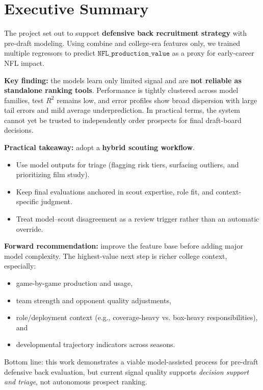\section{Executive Summary}

The project set out to support \textbf{defensive back recruitment strategy} with pre-draft modeling. Using combine and college-era features only, we trained multiple regressors to predict $\texttt{NFL\_production\_value}$ as a proxy for early-career NFL impact.

\textbf{Key finding:} the models learn only limited signal and are \textbf{not reliable as standalone ranking tools}. Performance is tightly clustered across model families, test $R^2$ remains low, and error profiles show broad dispersion with large tail errors and mild average underprediction. In practical terms, the system cannot yet be trusted to independently order prospects for final draft-board decisions.

\textbf{Practical takeaway:} adopt a \textbf{hybrid scouting workflow}.
\begin{itemize}
    \item Use model outputs for triage (flagging risk tiers, surfacing outliers, and prioritizing film study).
    \item Keep final evaluations anchored in scout expertise, role fit, and context-specific judgment.
    \item Treat model--scout disagreement as a review trigger rather than an automatic override.
\end{itemize}

\textbf{Forward recommendation:} improve the feature base before adding major model complexity. The highest-value next step is richer college context, especially:
\begin{itemize}
    \item game-by-game production and usage,
    \item team strength and opponent quality adjustments,
    \item role/deployment context (e.g., coverage-heavy vs.
    box-heavy responsibilities), and
    \item developmental trajectory indicators across seasons.
\end{itemize}

Bottom line: this work demonstrates a viable model-assisted process for pre-draft defensive back evaluation, but current signal quality supports \emph{decision support and triage}, not autonomous prospect ranking.
